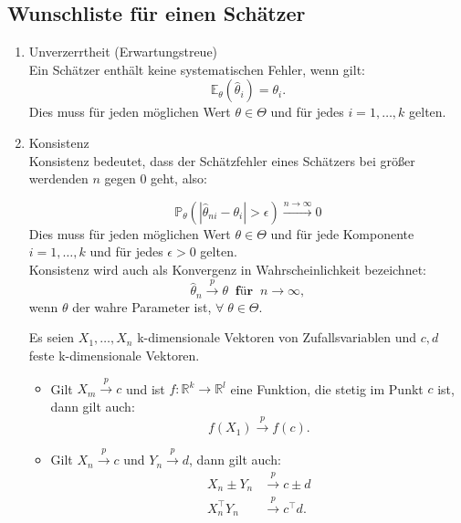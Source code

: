 \documentclass[10pt]{article}
\newcommand{\FZV}{X_1, \ldots, X_n} %
\newcommand{\IR}{\mathbb{R}} %
\newcommand{\EW}{\mathbb{E}} %
\newcommand{\KW}{\overset{p} \longrightarrow} %
\begin{document}
	
\subsection{Wunschliste für einen Schätzer}
\begin{enumerate}
	\item Unverzerrtheit (Erwartungstreue)\\
	Ein Schätzer enthält keine systematischen Fehler, wenn gilt:
	\begin{equation*}
		\EW_\theta(\hat{\theta}_i) = \theta_i.
	\end{equation*}
	Dies muss für jeden möglichen Wert $\theta \in \Theta$ und für jedes $i = 1, \ldots, k$ gelten. 
	
	\item Konsistenz \\
	Konsistenz bedeutet, dass der Schätzfehler eines Schätzers bei größer werdenden $n$ gegen $0$ geht, also:
	
	
	\begin{equation*}
			\mathbb{P}_\theta(|\hat{\theta}_{ni} - \theta_i| > \epsilon) \overset{n \rightarrow \infty}{\longrightarrow} 0
	\end{equation*}
	Dies muss für jeden möglichen Wert $\theta \in \Theta$ und für jede Komponente $i = 1, \ldots, k$ und für jedes $\epsilon > 0$ gelten.\\
	Konsistenz wird  auch als Konvergenz in Wahrscheinlichkeit bezeichnet:
	\begin{equation*}
		\hat{\theta}_n \overset{p} \longrightarrow \theta \;\; \textbf{für} \;\; n \rightarrow \infty,
	\end{equation*}
	wenn $\theta$ der wahre Parameter ist, $\forall \; \theta \in \Theta$. \\
	
	\begin{Bemerkung} 
		Es seien $\FZV$ k-dimensionale Vektoren von Zufallsvariablen und $c,d$  feste k-dimensionale Vektoren. 
		\begin{itemize}
			\item Gilt $X_m \KW c$ und ist $f: \IR^k \rightarrow \IR^l$ eine Funktion, die stetig im Punkt $c$ ist, dann gilt auch: \begin{equation*}
				f(X_1) \KW f(c).
			\end{equation*}
			\item Gilt $X_n \KW c$ und $Y_n \KW d$, dann gilt auch:
			\begin{equation*}
				\begin{split}
					X_n \pm Y_n &\KW c \pm d\\
					X_n^\top Y_n &\KW c^\top d.
				\end{split}
			\end{equation*}
		\end{itemize}
	\end{Bemerkung}
	

\end{enumerate}
\end{document}
